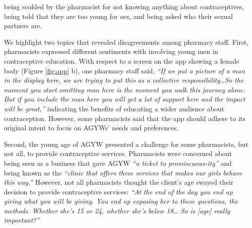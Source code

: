  being scolded by the pharmacist for not knowing anything about contraceptives, being told that they are too young for sex, and being asked who their sexual partners are. 

We highlight two topics that revealed disagreements among pharmacy staff. First, pharmacists expressed different sentiments with involving young men in contraceptive education. With respect to a screen on the app showing a female body (Figure \ref{fig:app} b), one pharmacy staff said, \textit{``If we put a picture of a man in the display here, we are trying to put this as a collective responsibility…So the moment you start omitting man here is the moment you walk this journey alone. But if you include the man here you will get a lot of support here and the impact will be great,”} indicating the benefits of educating a wider audience about contraception. However, some pharmacists said that the app should adhere to its original intent to focus on AGYWs' needs and preferences. 

Second, the young age of AGYW presented a challenge for some pharmacists, but not all, to provide contraceptive services. Pharmacists were concerned about being seen as a business that gave AGYW \textit{``a ticket to promiscuous-ity”} and being known as the \textit{``clinic that offers these services that makes our girls behave this way.”} However, not all pharmacists thought the client’s age swayed their decision to provide contraceptive services: \textit{``At the end of the day you end up giving what you will be giving. You end up exposing her to these questions, the methods. Whether she's 15 or 24, whether she's below 18… So is [age] really important?”}

